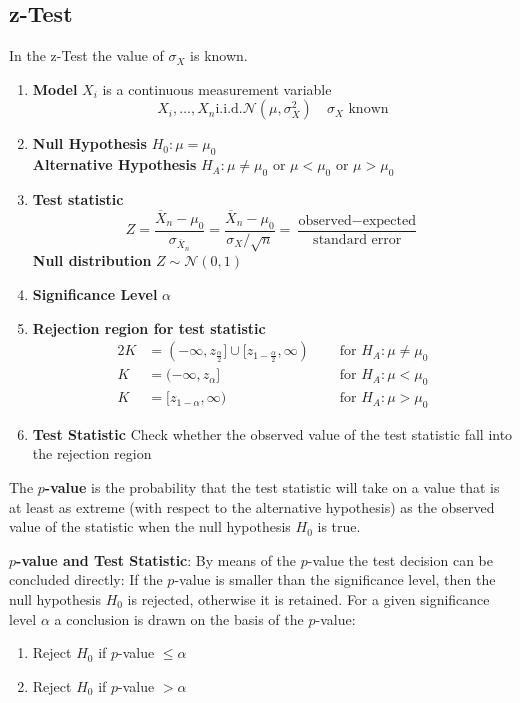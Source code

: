 \documentclass[11pt]{article}
\theoremstyle{definition}
\newcommand\sample[1]{\overline{#1}}
\begin{document}
\subsection{z-Test}
In the z-Test the value of $\sigma_X$ is known.
\begin{enumerate}
	\item \textbf{Model} $X_i$ is a continuous measurement variable
	\begin{equation*}
		X_i, \dots, X_n \text{i.i.d.} \mathcal{N}(\mu, \sigma_X^2)\quad \sigma_X\text{ known}
	\end{equation*}
	\item \textbf{Null Hypothesis} $H_0: \mu = \mu_0$\\ \textbf{Alternative Hypothesis} $H_A: \mu \neq \mu_0 \text{ or } \mu < \mu_0 \text{ or } \mu > \mu_0$
	\item \textbf{Test statistic}
	\begin{equation*}
		Z = \frac{\sample{X}_n - \mu_0}{\sigma_{\sample{X}_n}} = \frac{\sample{X}_n - \mu_0}{\sigma_X / \sqrt{n}} = \frac{\text{observed} - \text{expected}}{\text{standard error}}
	\end{equation*}
	\textbf{Null distribution} $Z \sim \mathcal{N}(0,1)$
	\item \textbf{Significance Level} $\alpha$
	\item \textbf{Rejection region for test statistic}
	\begin{alignat*}{2}
		K &= (-\infty,z_{\frac{\alpha}{2}}] \cup [z_{1-\frac{\alpha}{2}}, \infty) &\quad \text{ for } H_A : \mu\neq \mu_0\\
		K &= (-\infty, z_\alpha] &\quad \text{ for } H_A : \mu < \mu_0\\
		K &= [ z_{1-\alpha}, \infty ) &\quad \text{ for } H_A : \mu > \mu_0
	\end{alignat*}
	\item \textbf{Test Statistic} Check whether the observed value of the test statistic fall into the rejection region
\end{enumerate}

\begin{definition}
	The \textbf{$p$-value} is the probability that the test statistic will take on a value that is at least as extreme (with respect to the alternative hypothesis) as the observed value of the statistic when the null hypothesis $H_0$ is true.
\end{definition}

\begin{definition}
	\textbf{$p$-value and Test Statistic}: By means of the $p$-value the test decision can be concluded directly: If the $p$-value is smaller than the significance level, then  the null hypothesis $H_0$ is rejected, otherwise it is retained. For a given significance level $\alpha$ a conclusion is drawn on the basis of the $p$-value:
	\begin{enumerate}
		\item Reject $H_0$ if $p$-value $\leq \alpha$
		\item Reject $H_0$ if $p$-value $> \alpha$
	\end{enumerate}
\end{definition}
\end{document}
